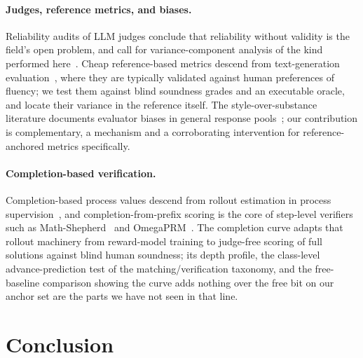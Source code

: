 \documentclass[11pt]{article}
\begin{document}
\paragraph{Judges, reference metrics, and biases.}
Reliability audits of LLM judges conclude that reliability without validity is the field's open problem, and call for variance-component analysis of the kind performed here~\cite{zheng2023judging,tan2024judgebench}.
Cheap reference-based metrics descend from text-generation evaluation~\cite{yuan2021bartscore}, where they are typically validated against human preferences of fluency; we test them against blind soundness grades and an executable oracle, and locate their variance in the reference itself.
The style-over-substance literature documents evaluator biases in general response pools~\cite{wu2023style,dubois2024length,singhal2023long}; our contribution is complementary, a mechanism and a corroborating intervention for reference-anchored metrics specifically.

\paragraph{Completion-based verification.}
Completion-based process values descend from rollout estimation in process supervision~\cite{lightman2023verify,wang2022selfconsistency}, and completion-from-prefix scoring is the core of step-level verifiers such as Math-Shepherd~\cite{wang2024mathshepherd} and OmegaPRM~\cite{luo2024omegaprm}.
The completion curve adapts that rollout machinery from reward-model training to judge-free scoring of full solutions against blind human soundness; its depth profile, the class-level advance-prediction test of the matching/verification taxonomy, and the free-baseline comparison showing the curve adds nothing over the free bit on our anchor set are the parts we have not seen in that line.

\section{Conclusion}
\end{document}
